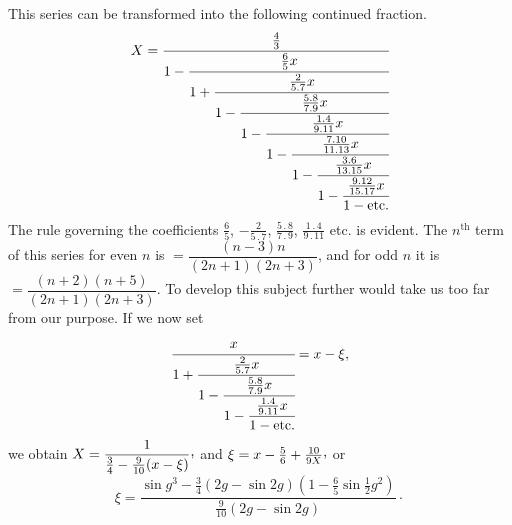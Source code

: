 This series can be transformed into the following continued fraction.
\[
X=\cfrac{\tfrac43}{1-\cfrac{\tfrac65x}{1+\cfrac{\tfrac{2}{5\mathbin{.}7}x}{1-\cfrac{\tfrac{5\mathbin{.}8}{7\mathbin{.}9}x}{1-\cfrac{\tfrac{1\mathbin{.}4}{9\mathbin{.}11}x}{1-\cfrac{\tfrac{7\mathbin{.}10}{11\mathbin{.}13}x}{1-\cfrac{\tfrac{3\mathbin{.}6}{13\mathbin{.}15}x}{1-\cfrac{\tfrac{9\mathbin{.}12}{15\mathbin{.}17}x}{1-\text{etc.}}}}}}}}}
\]
The rule governing the coefficients $\tfrac65$, $-\tfrac{2}{5\mathbin{.}7}$, $\tfrac{5\mathbin{.}8}{7\mathbin{.}9}$, $\tfrac{1\mathbin{.}4}{9\mathbin{.}11}$ etc. is evident. The $n^{\mathrm{th}}$ term of this series for even $n$ is $=\dfrac{(n-3)n}{(2n+1)(2n+3)}$, and for odd $n$ it is $=\dfrac{(n+2)(n+5)}{(2n+1)(2n+3)}$. To develop this subject further\HistoricalNoteEight{See Vol. III, p. 135.]} would take us too far from our purpose. If we now set
\[
\cfrac{x}{1+\cfrac{\tfrac{2}{5\mathbin{.}7}x}{1-\cfrac{\tfrac{5\mathbin{.}8}{7\mathbin{.}9}x}{1-\cfrac{\tfrac{1\mathbin{.}4}{9\mathbin{.}11}x}{1-\text{etc.}}}}}=x-\xi,
\]
we obtain $X=\dfrac{1}{\frac34-\frac{9}{10}(x-\xi)}\mathpunct{\raisebox{.45ex}{,}}$ and $\xi=x-\frac56+\frac{10}{9X}\mathpunct{\raisebox{.45ex}{,}}$ or
\[
\xi=\dfrac{\sin g^3-\frac34(2g-\sin 2g)(1-\frac65\sin\frac12 g^2)}{\frac{9}{10}(2g-\sin 2g)}\mathpunct{\cdot}
\]

